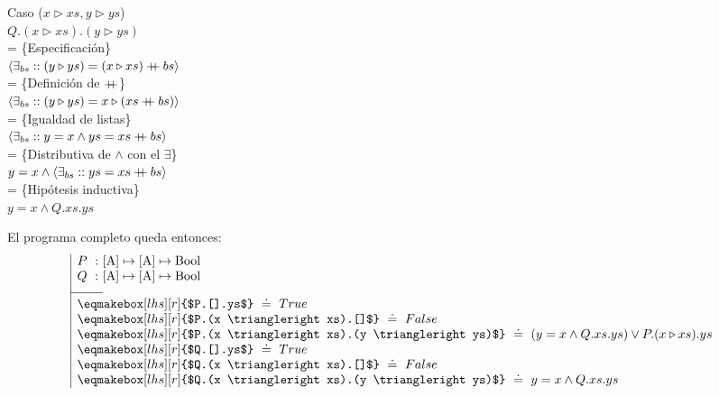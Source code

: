 \documentclass[12pt]{article}
\newcommand{\concat}{%
  \mathbin{{+}\mspace{-8mu}{+}}%
}
\begin{document}
\begin{itemize}
    \bigbreak

    Caso ($x \triangleright xs, y \triangleright ys$)\\
    $ Q.(x \triangleright xs).(y \triangleright ys) $\\
    = \{Especificación\}\\
    $ \langle \exists_{bs} :: (y \triangleright ys) = (x \triangleright xs) \concat bs \rangle $\\
    = \{Definición de $\concat$\}\\
    $ \langle \exists_{bs} :: (y \triangleright ys) = x \triangleright (xs \concat bs) \rangle $\\
    = \{Igualdad de listas\}\\
    $ \langle \exists_{bs} :: y = x \land ys = xs \concat bs \rangle $\\
    = \{Distributiva de $\land$ con el $\exists$\}\\
    $ y = x \land \langle \exists_{bs} :: ys = xs \concat bs \rangle $\\
    = \{Hipótesis inductiva\}\\
    $ y = x \land Q.xs.ys $

    \bigbreak

    El programa completo queda entonces:
    \[
    \begin{array}{| r @{} l }
        P ~ : ~ & [\text{A}] \mapsto [\text{A}] \mapsto \text{Bool} \\
        \rule[-10pt]{0pt}{0pt}Q ~ : ~ & [\text{A}] \mapsto [\text{A}] \mapsto \text{Bool} \\
        \cline{1-1}
        \multicolumn{2}{|l}{\rule{0pt}{12pt}\eqmakebox[lhs][r]{$P.[].ys$} ~ \doteq ~ True} \\
        \multicolumn{2}{|l}{\eqmakebox[lhs][r]{$P.(x \triangleright xs).[]$} ~ \doteq ~ False} \\
        \multicolumn{2}{|l}{\eqmakebox[lhs][r]{$P.(x \triangleright xs).(y \triangleright ys)$} ~ \doteq ~ (y = x \land Q.xs.ys) \lor P.(x \triangleright xs).ys} \\
        \multicolumn{2}{|l}{\eqmakebox[lhs][r]{$Q.[].ys$} ~ \doteq ~ True} \\
        \multicolumn{2}{|l}{\eqmakebox[lhs][r]{$Q.(x \triangleright xs).[]$} ~ \doteq ~ False} \\
        \multicolumn{2}{|l}{\eqmakebox[lhs][r]{$Q.(x \triangleright xs).(y \triangleright ys)$} ~ \doteq ~ y = x \land Q.xs.ys} \\
    \end{array}
    \]
    

\end{itemize}
\end{document}
